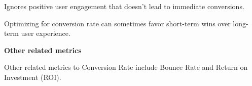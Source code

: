 {
\item Ignores positive user engagement that doesn’t lead to immediate conversions.
\item Optimizing for conversion rate can sometimes favor short-term wins over long-term user experience.
}

\textbf{Other related metrics}

Other related metrics to Conversion Rate include Bounce Rate and Return on Investment (ROI).

